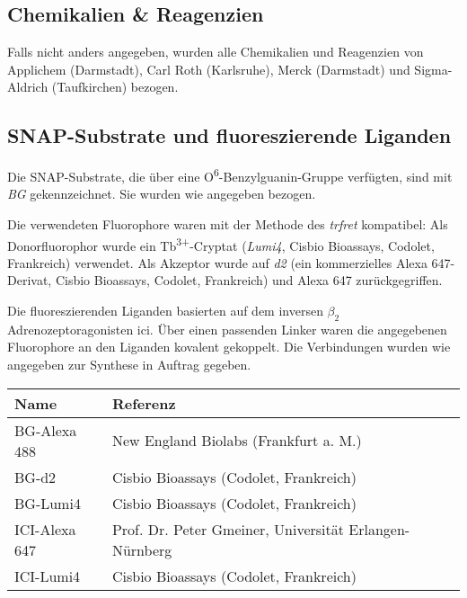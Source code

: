 \subsection{Chemikalien \& Reagenzien}\label{chemikalien}
Falls nicht anders angegeben, wurden alle Chemikalien und Reagenzien von Applichem (Darmstadt), Carl Roth (Karlsruhe), Merck (Darmstadt) und Sigma-Aldrich (Taufkirchen) bezogen. 

\subsection{SNAP-Substrate und fluoreszierende Liganden} \label{substrate}

Die SNAP-Substrate, die über eine O\textsuperscript{6}-Benzylguanin-Gruppe verfügten, sind mit \textit{BG} gekennzeichnet. Sie wurden wie angegeben bezogen.

Die verwendeten Fluorophore waren mit der Methode des \textit{\gls{trfret}} kompatibel: Als Donorfluorophor wurde ein Tb\textsuperscript{3+}-Cryptat (\textit{Lumi4}, Cisbio Bioassays, Codolet, Frankreich) verwendet.  Als Akzeptor wurde auf \textit{d2} (ein kommerzielles Alexa 647-Derivat, Cisbio Bioassays, Codolet, Frankreich) und Alexa 647 zurückgegriffen.

Die fluoreszierenden Liganden basierten auf dem inversen $\beta_2$\-Adrenozeptoragonisten \gls{ici}. Über einen passenden Linker waren die angegebenen Fluorophore an den Liganden kovalent gekoppelt. Die Verbindungen wurden wie angegeben zur Synthese in Auftrag gegeben.

\begin{table}[htsb]
\begin{tabularx}{\textwidth}{lll}
\toprule
Name							&	Referenz\\
\midrule
BG-Alexa 488						&	New England Biolabs (Frankfurt a. M.)\\
BG-d2							&	Cisbio Bioassays (Codolet, Frankreich)\\
BG-Lumi4						&	Cisbio Bioassays (Codolet, Frankreich)\\
\midrule
ICI-Alexa 647					&	Prof. Dr. Peter Gmeiner, Universität Erlangen-Nürnberg\\
ICI-Lumi4						& 	Cisbio Bioassays (Codolet, Frankreich)\\
\bottomrule
\end{tabularx}
\end{table}

